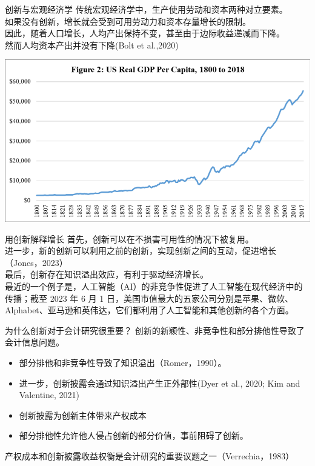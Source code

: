 \documentclass{beamer}
\begin{document}
\begin{frame}{创新与宏观经济学}
	传统宏观经济学中，生产使用劳动和资本两种对立要素。\\
	如果没有创新，增长就会受到可用劳动力和资本存量增长的限制。\\
	因此，随着人口增长，人均产出保持不变，甚至由于边际收益递减而下降。\\
	然而人均资本产出并没有下降(Bolt et al.,2020)\\
	\begin{center}
		\includegraphics[width=0.6\linewidth]{pic/fig2.png}
	\end{center}
\end{frame}

\begin{frame}{用创新解释增长}
	首先，创新可以在不损害可用性的情况下被复用。\\
	进一步，新的创新可以利用之前的创新，实现创新之间的互动，促进增长（Jones，2023）\\
	最后，创新存在知识溢出效应，有利于驱动经济增长。\\
	最近的一个例子是，人工智能（AI）的非竞争性促进了人工智能在现代经济中的传播；截至 2023 年 6 月 1 日，美国市值最大的五家公司分别是苹果、微软、Alphabet、亚马逊和英伟达，它们都利用了人工智能和其他创新的各个方面。
\end{frame}

\begin{frame}{为什么创新对于会计研究很重要？}
	\alert{创新的新颖性、非竞争性和部分排他性导致了会计信息问题。}
	\begin{itemize}
		\item 部分排他和非竞争性导致了知识溢出（Romer，1990）。
		\item 进一步，创新披露会通过知识溢出产生正外部性(Dyer et al., 2020; Kim and Valentine, 2021)
		\item 创新披露为创新主体带来产权成本
		\item 部分排他性允许他人侵占创新的部分价值，事前阻碍了创新。
	\end{itemize}
	产权成本和创新披露收益权衡是会计研究的重要议题之一（Verrechia，1983）
\end{frame}
\end{document}
